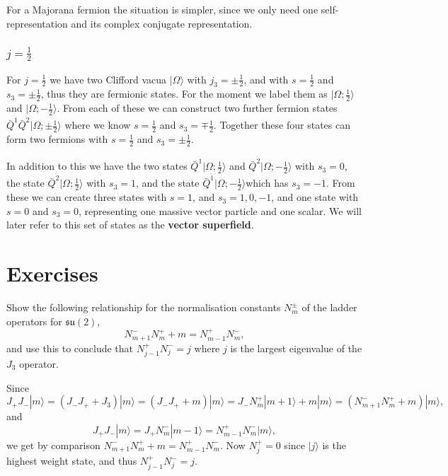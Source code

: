 \documentclass[notes.tex]{subfiles}
\begin{document}
For a Majorana fermion the situation is simpler, since we only need one self-representation and its complex conjugate representation. 

\subsubsection{$j=\frac{1}{2}$}
For $j=\frac{1}{2}$ we have two Clifford vacua $|\Omega\rangle $ with $j_3=\pm\frac{1}{2}$, and with $s=\frac{1}{2}$ and $s_3 = \pm\frac{1}{2}$, thus they are fermionic states. For the moment we label them as  $|\Omega; \frac{1}{2}\rangle$ and $|\Omega; -\frac{1}{2}\rangle$. From each of these we can construct two further fermion states $\bar{Q}^{\dot{1}}\bar{Q}^{\dot{2}}|\Omega;\pm \frac{1}{2}\rangle$ where we know $s=\frac{1}{2}$ and $s_3 = \mp\frac{1}{2}$.  Together these four states can form two fermions with $s = \frac{1}{2}$ and $s_3=\pm\frac{1}{2}$.

In addition to this we have the two states $\bar{Q}^{\dot{1}}|\Omega;\frac{1}{2}\rangle$ and $\bar{Q}^{\dot{2}}|\Omega; -\frac{1}{2}\rangle$ with $s_3 = 0$, the state $\bar{Q}^{\dot{2}}|\Omega;\frac{1}{2}\rangle$ with $s_3 = 1$, and the state $\bar{Q}^{\dot{1}}|\Omega;-\frac{1}{2}\rangle$which has $s_3 = -1$. From these we can create three states with $s=1$, and $s_3 = 1, 0, -1$, and one state with $s=0$ and $s_3=0$, representing one massive vector particle and one scalar. We will later refer to this set of states as the {\bf vector superfield}.




\section{Exercises}

\begin{Exercise}[label=ex:ladder_norm]
Show the following relationship for the normalisation constants $N_m^\pm$ of the ladder operators for $\mathfrak{su}(2)$,
\[ N_{m+1}^-N_m^++m=N_{m-1}^+N_m^-,\]
and use this to conclude that $N_{j-1}^+N_j^-=j$ where $j$ is the largest eigenvalue of the $J_3$ operator.
\end{Exercise}

\begin{Answer} 
Since 
\[ J_+J_-|m\rangle=(J_- J_++J_3) |m\rangle=(J_- J_++m) |m\rangle=J_- N_m^+|m+1\rangle+m |m\rangle=(N_{m+1}^-N_m^++m) |m\rangle, \]
and
\[ J_+J_-|m\rangle=J_+N_m^-|m-1\rangle= N_{m-1}^+N_m^-|m\rangle, \]
we get by comparison $N_{m+1}^-N_m^++m=N_{m-1}^+N_m^-$. Now $N_j^+=0$ since $|j\rangle$ is the highest weight state, and thus $N_{j-1}^+N_j^-=j$.
\end{Answer}
\end{document}
